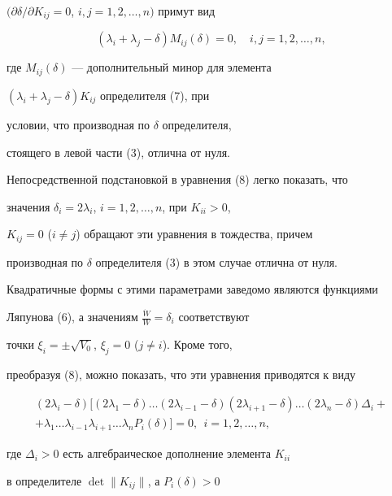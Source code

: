 \begin{pf}
$(\partial \delta / \partial K_{ij}=0$, $i,j=1,2,\dotsc,n)$ примут вид


\begin{equation}


(\lambda_{i}+\lambda_{j}-\delta)M_{ij}(\delta )=0,\quad i,j=1,2,\dotsc,n,


\end{equation}


где $M_{ij}(\delta )$ --- дополнительный минор для элемента


$(\lambda_{i}+\lambda_{j}-\delta )K_{ij}$ определителя (7), при 


условии, что производная по $\delta $ определителя,


стоящего в левой части (3), отлична от нуля.





Непосредственной подстановкой в уравнения (8) легко показать, что


значения $\delta_{i}=2\lambda_{i}$, $i=1,2,\dotsc,n$, при $K_{ii}>0$,


$K_{ij}=0$ ($i\ne j$) обращают эти уравнения в тождества, причем


производная по $\delta $ определителя (3) в этом случае отлична от нуля.


Квадратичные формы с этими параметрами заведомо являются функциями


Ляпунова (6), а значениям $\frac {\Dot W}{W}=\delta_{i}$ соответствуют


точки $\xi_{i}=\pm \sqrt {V_{0}}$, $\xi_{j}=0$ ($j\ne i$). Кроме того,


преобразуя (8), можно показать, что эти уравнения приводятся к виду


\begin{multline}


(2\lambda_{i}-\delta )[(2\lambda_{1}-\delta )\dotsc (2\lambda_{i-1}-\delta )


(2\lambda_{i+1}-\delta )\dotsc (2\lambda_{n}-\delta )\Delta_{i}+\\+


\lambda_{1}\dotsc \lambda_{i-1}\lambda_{i+1}\dotsc \lambda_{n}


P_{i}(\delta )]=0, \ \ i=1,2,\dotsc,n,


\end{multline}


где $\Delta_{i}>0$ есть алгебраическое дополнение элемента $K_{ii}$


в определителе $\det\|K_{ij}\|$, а $P_{i}(\delta )>0$



\end{pf}
